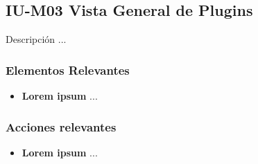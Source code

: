 
\subsection{IU-M03 Vista General de Plugins}

 Descripción ...


\subsubsection{Elementos Relevantes}

    \begin{itemize}
    \item {\bf Lorem ipsum}
        ...
    \end{itemize}

\subsubsection{Acciones relevantes}

    \begin{itemize}
    \item {\bf Lorem ipsum}
        ...
    \end{itemize}

\clearpage
